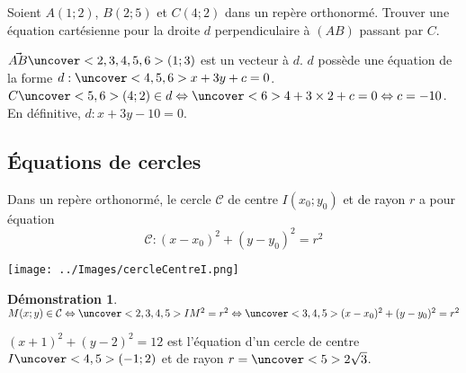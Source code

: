 \documentclass{beamer}
\theoremstyle{plain}
\newtheorem{demonstration}[theorem]{Démonstration}
\begin{document}
 \begin{frame}
 \begin{example}
  Soient $A(1;2)$, $B(2;5)$ et $C(4;2)$ dans un repère orthonormé. Trouver une équation 
  cartésienne pour la droite $d$ perpendiculaire à $(AB)$ passant par $C$.
  
  $\vec{AB}\uncover<2,3,4,5,6>{(1;3)}$ est un vecteur  à $d$. 
  $d$ possède une équation de la forme $d:\uncover<4,5,6>{x+3y+c=0}$.
  $C\uncover<5,6>{(4;2)} \in d \Leftrightarrow \uncover<6>{4+3 \times 2+c=0} \Leftrightarrow c=-10$. En définitive,
  $d:x+3y-10=0$.
 \end{example}
 \end{frame}
 
 \subsection{\'Equations de cercles}

 \begin{frame}
\begin{theorem}
 Dans un repère orthonormé, le cercle $\mathcal{C}$ de centre $I(x_0;y_0)$ et de rayon $r$ a
 pour équation $$\mathcal{C}:(x-x_0)^2+(y-y_0)^2=r^2$$
 
      \begin{center}
    \texttt{[image: ../Images/cercleCentreI.png]}
  \end{center}
\end{theorem}

\end{frame}

\begin{frame}
\begin{demonstration}
 $M(x;y) \in \mathcal{C} \Leftrightarrow \uncover<2,3,4,5>{IM^2=r^2} 
 \Leftrightarrow \uncover<3,4,5>{(x-x_0)^2+(y-y_0)^2=r^2}$
\end{demonstration}


\begin{example}
 $(x+1)^2+(y-2)^2=12$ est l'équation d'un cercle de centre $I\uncover<4,5>{(-1;2)}$ et de rayon 
 $r=\uncover<5>{2\sqrt{3}}$.
\end{example}
\end{frame}
\end{document}
